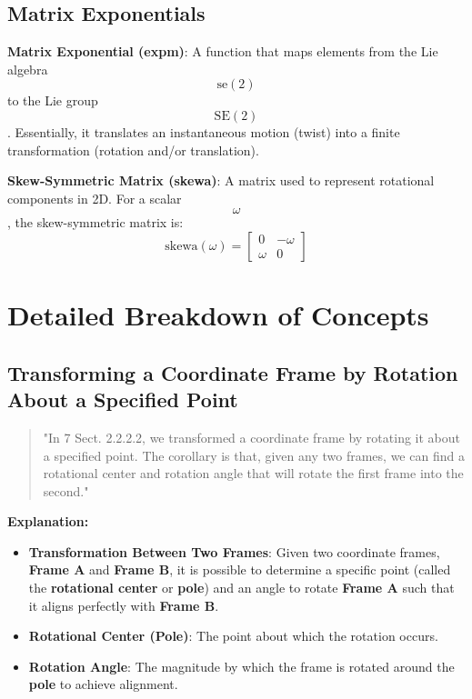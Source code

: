 \documentclass[12pt]{article}
\begin{document}
\subsection{Matrix Exponentials}

\textbf{Matrix Exponential (expm)}: A function that maps elements from the Lie algebra $$\text{se}(2)$$ to the Lie group $$\text{SE}(2)$$. Essentially, it translates an instantaneous motion (twist) into a finite transformation (rotation and/or translation).

\textbf{Skew-Symmetric Matrix (skewa)}: A matrix used to represent rotational components in 2D. For a scalar $$\omega$$, the skew-symmetric matrix is:
$$
\text{skewa}(\omega) = 
\begin{bmatrix}
0 & -\omega \\
\omega & 0 
\end{bmatrix}
$$

\section{Detailed Breakdown of Concepts}

\subsection{Transforming a Coordinate Frame by Rotation About a Specified Point}

\begin{quote}
"In 7 Sect. 2.2.2.2, we transformed a coordinate frame by rotating it about a specified point. The corollary is that, given any two frames, we can find a rotational center and rotation angle that will rotate the first frame into the second."
\end{quote}

\textbf{Explanation:}

\begin{itemize}
    \item \textbf{Transformation Between Two Frames}: Given two coordinate frames, \textbf{Frame A} and \textbf{Frame B}, it is possible to determine a specific point (called the \textbf{rotational center} or \textbf{pole}) and an angle to rotate \textbf{Frame A} such that it aligns perfectly with \textbf{Frame B}.
    
    \item \textbf{Rotational Center (Pole)}: The point about which the rotation occurs.
    
    \item \textbf{Rotation Angle}: The magnitude by which the frame is rotated around the \textbf{pole} to achieve alignment.
\end{itemize}
\end{document}
